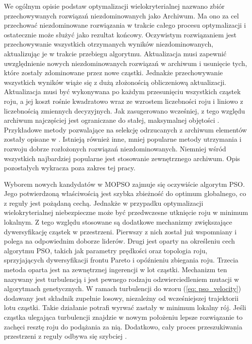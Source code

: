 We ogólnym opisie podstaw optymalizacji wielokryterialnej nazwano zbiór przechowywanych rozwiązań niezdominowanych jako Archiwum. Ma ono za cel przechować niezdominowane rozwiązania w trakcie całego procesu optymalizacji i ostatecznie może służyć jako rezultat końcowy. Oczywistym rozwiązaniem jest przechowywanie wszystkich otrzymanych wyników niezdominowanych, aktualizując je w trakcie przebiegu algorytmu. Aktualizacja musi zapewnić uwzględnienie nowych niezdominowanych rozwiązań w archiwum i usunięcie tych, które zostały zdominowane przez nowe cząstki. Jednakże przechowywanie wszystkich wyników wiąże się z dużą złożonością obliczeniową aktualizacji. Aktualizacja musi być wykonywana po każdym przesunięciu wszystkich cząstek roju, a jej koszt rośnie kwadratowo wraz ze wzrostem liczebności roju i liniowo z liczebnością zmiennych decyzyjnych. Jak zasugerowano wcześniej, z tego względu archiwum najczęściej jest ograniczane do stałej, maksymalnej objętości \parencite{Coello2007}. Przykładowe metody pozwalające na selekcję odrzucanych z archiwum elementów zostały opisane w \parencite{Zitzler1999,Knowles2000}. Istnieją również  inne, mniej popularne metody utrzymania i rozwoju dobrze rozłożonych rozwiązań niezdominowanych. Niemniej wśród wszystkich najbardziej popularne jest stosowanie zewnętrznego archiwum. Opis pozostałych wykracza poza zakres tej pracy.

Wyborem nowych kandydatów w MOPSO zajmuje się oczywiście algorytm PSO. Jego potwierdzoną właściwością jest szybka zbieżność do optimum globalnego, co z reguły jest pożądaną cechą. Jednakże w przypadku optymalizacji wielokryterialnej niebezpieczne może być przedwczesne utknięcie roju w minimum lokalnym. Z tego względu stosowane są dodatkowe mechanizmy zwiększające dywersyfikację cząstek w przestrzeni. Pierwszy z nich został już wspomniany i polega na odpowiednim doborze liderów. Drugi jest oparty na określeniu cech algorytmu PSO, takich jak parametry prędkości oraz topologia roju, sprzyjających dywersyfikacji frontu Pareto i opóźnieniu zbiegania roju. Trzecia metoda oparta jest na zewnętrznej ingerencji w lot cząstki. Mechanizm ten nazywany jest turbulencją \parencite{Fieldsend} i jest pewnego rodzaju odzwierciedleniem mutacji w algorytmach genetycznych. W ramach turbulencji do wzoru (\ref{eq: pso_velocity}) dodawany jest składnik zupełnie losowy, niezależny od wcześniejszej trajektorii lotu cząstki. Takie działanie potrafi wyrwać zastały w minimum lokalny rój. Jeśli cząstka ulegająca turbulencji znajdzie w nowym położeniu lepsze rozwiązanie to zachęci resztę roju do podążania za nią. Dodatkowo, cały proces przeszukiwania przestrzeni z reguły odbywa się szybciej \parencite{Stacey2003}.
